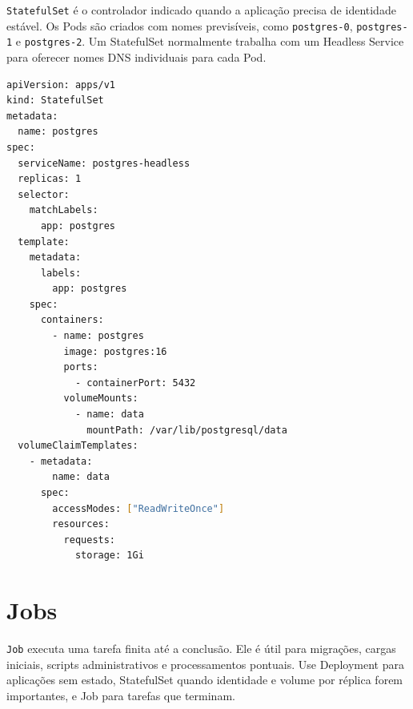 \documentclass[11pt,a4paper]{article}
\begin{document}
\texttt{StatefulSet} é o controlador indicado quando a aplicação precisa de identidade estável. Os Pods são criados com nomes previsíveis, como \texttt{postgres-0}, \texttt{postgres-1} e \texttt{postgres-2}. Um StatefulSet normalmente trabalha com um Headless Service para oferecer nomes DNS individuais para cada Pod.

\begin{lstlisting}[language=bash]
apiVersion: apps/v1
kind: StatefulSet
metadata:
  name: postgres
spec:
  serviceName: postgres-headless
  replicas: 1
  selector:
    matchLabels:
      app: postgres
  template:
    metadata:
      labels:
        app: postgres
    spec:
      containers:
        - name: postgres
          image: postgres:16
          ports:
            - containerPort: 5432
          volumeMounts:
            - name: data
              mountPath: /var/lib/postgresql/data
  volumeClaimTemplates:
    - metadata:
        name: data
      spec:
        accessModes: ["ReadWriteOnce"]
        resources:
          requests:
            storage: 1Gi
\end{lstlisting}

\section*{\color{primary}Jobs}

\texttt{Job} executa uma tarefa finita até a conclusão. Ele é útil para migrações, cargas iniciais, scripts administrativos e processamentos pontuais. Use Deployment para aplicações sem estado, StatefulSet quando identidade e volume por réplica forem importantes, e Job para tarefas que terminam.
\end{document}
